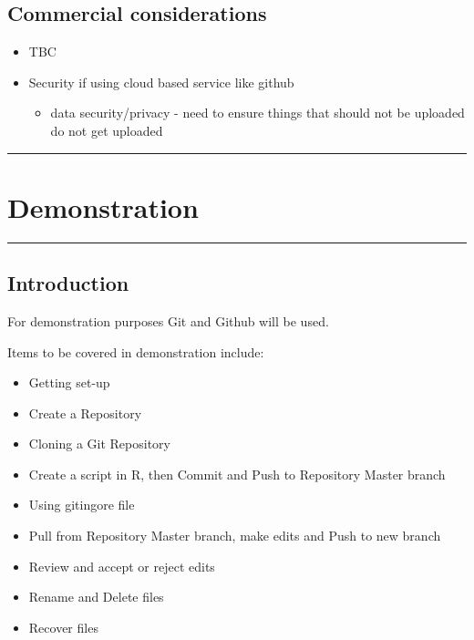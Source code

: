 \documentclass[
]{article}
\providecommand{\tightlist}{%
  \setlength{\itemsep}{0pt}\setlength{\parskip}{0pt}}
\begin{document}
\hypertarget{commercial-considerations}{%
\subsection{Commercial considerations}\label{commercial-considerations}}

\begin{itemize}
\tightlist
\item
  TBC
\item
  Security if using cloud based service like github

  \begin{itemize}
  \tightlist
  \item
    data security/privacy - need to ensure things that should not be
    uploaded do not get uploaded
  \end{itemize}
\end{itemize}

\begin{center}\rule{0.5\linewidth}{0.5pt}\end{center}

\hypertarget{demonstration}{%
\section{Demonstration }\label{demonstration}}

\begin{center}\rule{0.5\linewidth}{0.5pt}\end{center}

\hypertarget{introduction-1}{%
\subsection{Introduction}\label{introduction-1}}

For demonstration purposes Git and Github will be used.

Items to be covered in demonstration include:

\begin{itemize}
\tightlist
\item
  Getting set-up
\item
  Create a Repository
\item
  Cloning a Git Repository
\item
  Create a script in R, then Commit and Push to Repository Master branch
\item
  Using gitingore file
\item
  Pull from Repository Master branch, make edits and Push to new branch
\item
  Review and accept or reject edits
\item
  Rename and Delete files
\item
  Recover files
\end{itemize}
\end{document}
